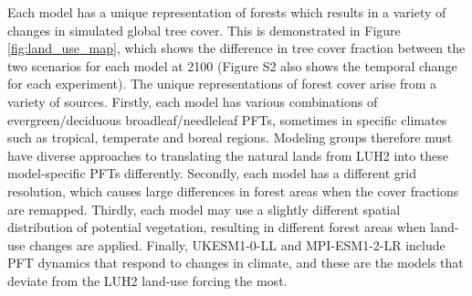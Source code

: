 \documentclass[draft]{agujournal2019}
\begin{document}
Each model has a unique representation of forests which results in a variety of changes in simulated global tree cover.
This is demonstrated in Figure \ref{fig:land_use_map}, which shows the difference in tree cover fraction between the two scenarios for each model at 2100 (Figure S2 also shows the temporal change for each experiment).
The unique representations of forest cover arise from a variety of sources.
Firstly, each model has various combinations of evergreen/deciduous broadleaf/needleleaf PFTs, sometimes in specific climates such as tropical, temperate and boreal regions.
Modeling groups therefore must have diverse approaches to translating the natural lands from LUH2 into these model-specific PFTs differently.
Secondly, each model has a different grid resolution, which causes large differences in forest areas when the cover fractions are remapped.
Thirdly, each model may use a slightly different spatial distribution of potential vegetation, resulting in different forest areas when land-use changes are applied.
Finally, UKESM1-0-LL and MPI-ESM1-2-LR include PFT dynamics that respond to changes in climate, and these are the models that deviate from the LUH2 land-use forcing the most.
\end{document}
